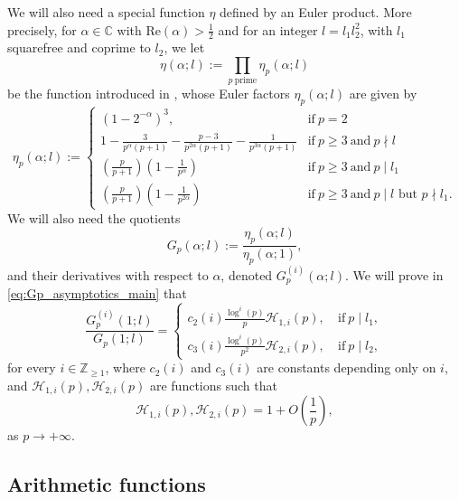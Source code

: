 \documentclass[10pt,a4paper]{amsart}
\theoremstyle{plain}
\theoremstyle{definition}
\theoremstyle{remark}
\newcommand{\C}{\mathbb{C}}
\begin{document}
We will also need a special function $\eta$ defined by an Euler product. More precisely, for $\alpha\in \C$ with $\mathrm{Re}(\alpha)>\frac{1}{2}$ and for an integer $l=l_1l_2^2$, with $l_1$ squarefree and coprime to $l_2$, we let 
\begin{equation}
    \label{eq:eta}
    \eta(\alpha;l):= \prod_{p \ \text{prime}}\eta_{p}(\alpha;l)
\end{equation}
be the function introduced in \cite[Lemma~5.1]{Soundararajan_2000}, whose Euler factors $\eta_p(\alpha;l)$ are given by
\begin{equation} \label{eq:eta_p}
    \eta_{p}(\alpha;l) := \begin{cases}
(1-2^{-\alpha})^3, & \text{if} \ p = 2 \\ 
1-\frac{3}{p^{\alpha}(p+1)}-\frac{p-3}{p^{2\alpha}(p+1)}-\frac{1}{p^{3\alpha}(p+1)} & \text{if} \ p \geq 3 \ \text{and} \ p\nmid l\\
\left(\frac{p}{p+1}\right)\left(1-\frac{1}{p^\alpha}\right) & \text{if} \ p \geq 3 \ \text{and} \  p\mid l_1\\
\left(\frac{p}{p+1}\right)\left(1-\frac{1}{p^{2\alpha}}\right) & \text{if} \ p \geq 3 \ \text{and} \ p\mid l \text{ but }p\nmid l_1.
\end{cases}
\end{equation}
We will also need the quotients
\begin{equation} \label{eq:Gp}
    G_p(\alpha;l) := \frac{\eta_p(\alpha;l)}{\eta_p(\alpha;1)},
\end{equation}
and their derivatives with respect to $\alpha$, denoted $G_p^{(i)}(\alpha;l)$. We will prove in \eqref{eq:Gp_asymptotics_main} that
\begin{equation} \label{eq:Gp_asymptotics_notation}
    \frac{G_p^{(i)}(1;l)}{G_p(1;l)} = \begin{cases}
        c_2(i) \frac{\log^i(p)}{p} \mathcal{H}_{1,i}(p), \ &\text{if} \ p \mid l_1, \\
        c_3(i) \frac{\log^i(p)}{p^2} \mathcal{H}_{2,i}(p), \ &\text{if} \ p \mid l_2,
    \end{cases}
\end{equation}
for every $i \in \mathbb{Z}_{\geq 1}$, where $c_2(i)$ and $c_3(i)$ are constants depending only on $i$, and $\mathcal{H}_{1,i}(p), \mathcal{H}_{2,i}(p)$ are functions such that 
\[
\mathcal{H}_{1,i}(p),\mathcal{H}_{2,i}(p) = 1 + O\left( \frac{1}{p} \right),
\]
as $p \to +\infty$.

\subsection{Arithmetic functions}
\label{sec:multiplicative_functions}
\end{document}
